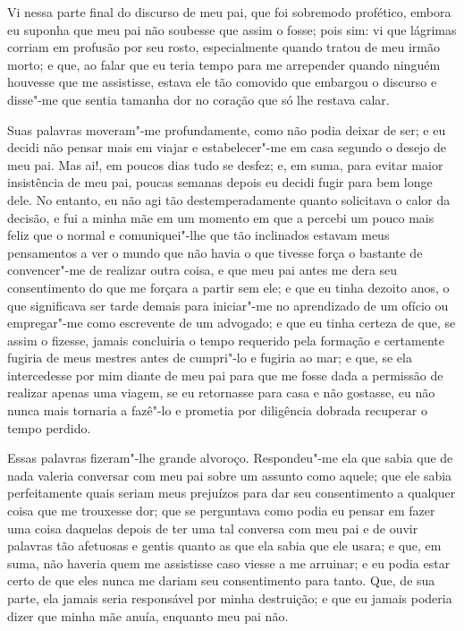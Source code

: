 Vi nessa parte final do discurso de meu pai, que foi sobremodo
profético, embora eu suponha que meu pai não soubesse que assim o fosse;
pois sim: vi que lágrimas corriam em profusão por seu rosto,
especialmente quando tratou de meu irmão morto; e que, ao falar que eu
teria tempo para me arrepender quando ninguém houvesse que me
assistisse, estava ele tão comovido que embargou o discurso e disse"-me
que sentia tamanha dor no coração que só lhe restava calar.

Suas palavras moveram"-me profundamente, como não podia deixar de ser; e
eu decidi não pensar mais em viajar e estabelecer"-me em casa segundo o
desejo de meu pai. Mas ai!, em poucos dias tudo se desfez; e, em suma,
para evitar maior insistência de meu pai, poucas semanas depois eu
decidi fugir para bem longe dele. No entanto, eu não agi tão
destemperadamente quanto solicitava o calor da decisão, e fui a minha
mãe em um momento em que a percebi um pouco mais feliz que o normal e
comuniquei"-lhe que tão inclinados estavam meus pensamentos a ver o mundo
que não havia o que tivesse força o bastante de convencer"-me de realizar
outra coisa, e que meu pai antes me dera seu consentimento do que me
forçara a partir sem ele; e que eu tinha dezoito anos, o que significava
ser tarde demais para iniciar"-me no aprendizado de um ofício ou
empregar"-me como escrevente de um advogado; e que eu tinha certeza de
que, se assim o fizesse, jamais concluiria o tempo requerido pela
formação e certamente fugiria de meus mestres antes de cumpri"-lo e
fugiria ao mar; e que, se ela intercedesse por mim diante de meu pai
para que me fosse dada a permissão de realizar apenas uma viagem, se eu
retornasse para casa e não gostasse, eu não nunca mais tornaria a
fazê"-lo e prometia por diligência dobrada recuperar o tempo perdido.

Essas palavras fizeram"-lhe grande alvoroço. Respondeu"-me ela que sabia
que de nada valeria conversar com meu pai sobre um assunto como aquele;
que ele sabia perfeitamente quais seriam meus prejuízos para dar seu
consentimento a qualquer coisa que me trouxesse dor; que se perguntava
como podia eu pensar em fazer uma coisa daquelas depois de ter uma tal
conversa com meu pai e de ouvir palavras tão afetuosas e gentis quanto
as que ela sabia que ele usara; e que, em suma, não haveria quem me
assistisse caso viesse a me arruinar; e eu podia estar certo de que eles
nunca me dariam seu consentimento para tanto. Que, de sua parte, ela
jamais seria responsável por minha destruição; e que eu jamais poderia
dizer que minha mãe anuía, enquanto meu pai não.

